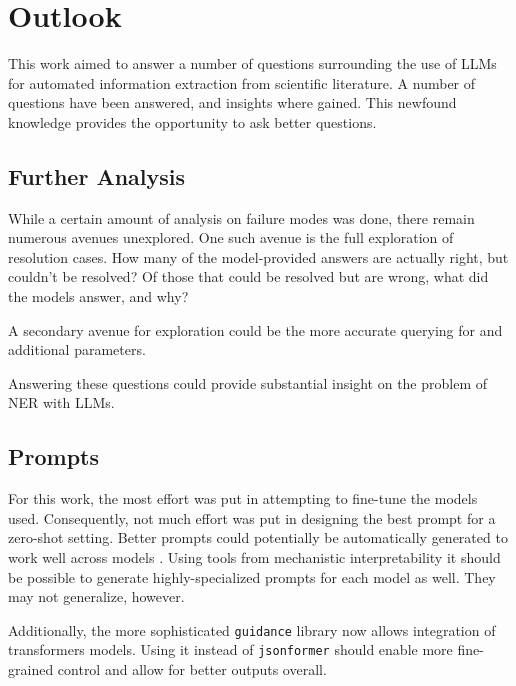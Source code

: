 \chapter{Outlook}\label{chap:outlook}
This work aimed to answer a number of questions surrounding the use of \glspl{LLM} for automated information extraction from scientific literature.
A number of questions have been answered, and insights where gained.
This newfound knowledge provides the opportunity to ask better questions.

\section{Further Analysis}\label{sec:out:analysis}
While a certain amount of analysis on failure modes was done, there remain numerous avenues unexplored.
One such avenue is the full exploration of \tsolv resolution cases.
How many of the model-provided answers are actually right, but couldn't be resolved?
Of those that could be resolved but are wrong, what did the models answer, and why?

A secondary avenue for exploration could be the more accurate querying for \tadd and additional parameters.

Answering these questions could provide substantial insight on the problem of \gls{NER} with \glspl{LLM}.

\section{Prompts}\label{sec:out:prompt}
For this work, the most effort was put in attempting to fine-tune the models used.
Consequently, not much effort was put in designing the best prompt for a zero-shot setting.
Better prompts could potentially be automatically generated to work well across models \cite{zhou_large_2022}.
Using tools from mechanistic interpretability \cite{conmy_automated_2023} it should be possible to generate highly-specialized prompts \cite{rumbelow_solidgoldmagikarp_2023} for each model as well. They may not generalize, however.

Additionally, the more sophisticated \texttt{guidance} \cite{guidance_2023} library now allows integration of \gls{transformers} models.
Using it instead of \texttt{jsonformer} should enable more fine-grained control and allow for better outputs overall.


